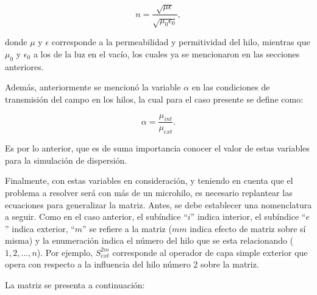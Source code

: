 \documentclass[12pt,letterpaper]{article}
\numberwithin{equation}{section}
\begin{document}
\begin{equation}
n = \frac{\sqrt{\mu\epsilon}}{\sqrt{\mu_0\epsilon_0}},
\end{equation}

\noindent donde $\mu$ y $\epsilon$ corresponde a la permeabilidad y permitividad del hilo, mientras que $\mu_{0}$ y $\epsilon_{0}$ a los de la luz en el vacío, los cuales ya se mencionaron en las secciones anteriores.

Además, anteriormente se mencionó la variable $\alpha$ en las condiciones de transmisión del campo en los hilos, la cual para el caso presente se define como:

\begin{equation}
\alpha = \frac{\mu_{int}}{\mu_{ext}}.
\end{equation} 

Es por lo anterior, que es de suma importancia conocer el valor de estas variables para la simulación de dispersión.

Finalmente, con estas variables en consideración, y teniendo en cuenta que el problema a resolver será con más de un microhilo, es necesario replantear las ecuaciones para generalizar la matriz. Antes, se debe establecer una nomenclatura a seguir. Como en el caso anterior, el subíndice ``$i$'' indica interior, el subíndice ``$e$'' indica exterior, ``$m$'' se refiere a la matriz ($mm$ indica efecto de matriz sobre sí misma) y la enumeración indica el número del hilo que se esta relacionando ($1,2,...,n$). Por ejemplo, $S_{ext}^{2m}$ corresponde al operador de capa simple exterior que opera con respecto a la influencia del hilo número 2 sobre la matriz.

La matriz se presenta a continuación:
\end{document}
